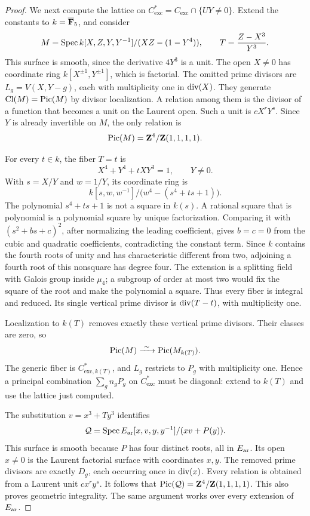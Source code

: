 \begin{proof}
We next compute the lattice on
\(C_{\mathrm{exc}}^*=C_{\mathrm{exc}}\cap\{UY\ne0\}\).
Extend the constants to \(k=\overline{\mathbf{F}}_5\), and consider
\[
 M=\operatorname{Spec} k[X,Z,Y,Y^{-1}]/(XZ-(1-Y^4)),
 \qquad
 T=\frac{Z-X^3}{Y^3}.
\]
This surface is smooth, since the derivative \(4Y^3\) is a unit.
The open \(X\ne0\) has coordinate ring
\(k[X^{\pm1},Y^{\pm1}]\), which is factorial.
The omitted prime divisors are
\(L_g=V(X,Y-g)\), each with multiplicity one in \(\operatorname{div}(X)\).
They generate \(\operatorname{Cl}(M)=\operatorname{Pic}(M)\) by divisor localization.
A relation among them is the divisor of a function that becomes a unit
on the Laurent open. Such a unit is \(cX^rY^s\).
Since \(Y\) is already invertible on \(M\), the only relation is
\[
 \operatorname{Pic}(M)=\mathbf{Z}^4/\mathbf{Z}(1,1,1,1).
\]

For every \(t\in k\), the fiber \(T=t\) is
\[
 X^4+Y^4+tXY^3=1,\qquad Y\ne0.
\]
With \(s=X/Y\) and \(w=1/Y\), its coordinate ring is
\[
 k[s,w,w^{-1}]/\bigl(w^4-(s^4+ts+1)\bigr).
\]
The polynomial \(s^4+ts+1\) is not a square in \(k(s)\).
A rational square that is polynomial is a polynomial square by unique
factorization. Comparing it with \((s^2+bs+c)^2\), after normalizing
the leading coefficient, gives \(b=c=0\) from the cubic and quadratic
coefficients, contradicting the constant term.
Since \(k\) contains the fourth roots of unity and has characteristic
different from two, adjoining a fourth root of this nonsquare has
degree four. The extension is a splitting field with Galois group
inside \(\mu_4\); a subgroup of order at most two would fix the square
of the root and make the polynomial a square.
Thus every fiber is integral and reduced.
Its single vertical prime divisor is \(\operatorname{div}(T-t)\), with
multiplicity one.

Localization to \(k(T)\) removes exactly these vertical prime
divisors. Their classes are zero, so
\[
 \DtwoPic(M)\xrightarrow{\ \sim\ }\DtwoPic(M_{k(T)}).
\]
The generic fiber is \(C_{\mathrm{exc},k(T)}^*\), and \(L_g\)
restricts to \(P_g\) with multiplicity one.
Hence a principal combination \(\sum_g n_gP_g\) on
\(C_{\mathrm{exc}}^*\) must be diagonal: extend to \(k(T)\) and use
the lattice just computed.

The substitution \(v=x^3+Ty^3\) identifies
\[
 \mathcal Q=\operatorname{Spec} E_{\mathrm{ar}}[x,v,y,y^{-1}]/(xv+P(y)).
\]
This surface is smooth because \(P\) has four distinct roots, all in
\(E_{\mathrm{ar}}\). Its open \(x\ne0\) is the Laurent factorial surface
with coordinates \(x,y\).
The removed prime divisors are exactly \(D_g\), each occurring once
in \(\operatorname{div}(x)\).
Every relation is obtained from a Laurent unit \(cx^ry^s\).
It follows that
\(\operatorname{Pic}(\mathcal Q)=\mathbf{Z}^4/\mathbf{Z}(1,1,1,1)\).
This also proves geometric integrality.
The same argument works over every extension of \(E_{\mathrm{ar}}\).


\end{proof}
